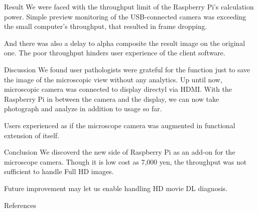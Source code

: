 \documentclass[
  dvipdfmx,
  xcolor={svgnames},
  hyperref={colorlinks,citecolor=DeepPink4,linkcolor=DarkRed,urlcolor=DarkBlue}
  ]{beamer}
\begin{document}
\begin{frame}{Result}
  We were faced with the throughput limit of the Raspberry Pi's calculation power. Simple preview monitoring of the USB-connected camera was exceeding the small computer's throughput, that resulted in frame dropping.
  \par
  \vspace{0.5zh}
  And there was also a delay to alpha composite the result image on the original one. The poor throughput hinders user experience of the client software.
\end{frame}

\begin{frame}{Discussion}
  We found user pathologists were grateful for the function just to save the image of the microscopic view without any analytics. Up until now, microscopic camera was connected to display directyl via HDMI. With the Raspberry Pi in between the camera and the display, we can now take photograph and analyze in addition to usage so far. \par
  \vspace{0.5zh}
  Users experienced as if the microscope camera was augmented in functional extension of itself.
\end{frame}

\begin{frame}{Conclusion}
  We discoverd the new side of Raspberry Pi as an add-on for the microscope camera. Though it is low cost as 7,000 yen, the throughput was not sufficient to handle Full HD images. \par
  \vspace{0.5zh}
  Future improvement may let us enable handling HD movie DL diagnosis.
\end{frame}

\begin{frame}{References}
  \begin{figure}
    \beamertemplatetextbibitems
    
    
  \end{figure}
\end{frame}
\end{document}
